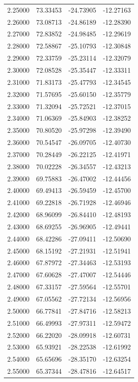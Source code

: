 \begin{table}
\begin{tabular}{llll}
2.25000 & 73.33453 & -24.73905 & -12.27163 \\
2.26000 & 73.08713 & -24.86189 & -12.28390 \\
2.27000 & 72.83852 & -24.98485 & -12.29619 \\
2.28000 & 72.58867 & -25.10793 & -12.30848 \\
2.29000 & 72.33759 & -25.23114 & -12.32079 \\
2.30000 & 72.08528 & -25.35447 & -12.33311 \\
2.31000 & 71.83173 & -25.47793 & -12.34545 \\
2.32000 & 71.57695 & -25.60150 & -12.35779 \\
2.33000 & 71.32094 & -25.72521 & -12.37015 \\
2.34000 & 71.06369 & -25.84903 & -12.38252 \\
2.35000 & 70.80520 & -25.97298 & -12.39490 \\
2.36000 & 70.54547 & -26.09705 & -12.40730 \\
2.37000 & 70.28449 & -26.22125 & -12.41971 \\
2.38000 & 70.02228 & -26.34557 & -12.43213 \\
2.39000 & 69.75883 & -26.47002 & -12.44456 \\
2.40000 & 69.49413 & -26.59459 & -12.45700 \\
2.41000 & 69.22818 & -26.71928 & -12.46946 \\
2.42000 & 68.96099 & -26.84410 & -12.48193 \\
2.43000 & 68.69255 & -26.96905 & -12.49441 \\
2.44000 & 68.42286 & -27.09411 & -12.50690 \\
2.45000 & 68.15192 & -27.21931 & -12.51941 \\
2.46000 & 67.87972 & -27.34463 & -12.53193 \\
2.47000 & 67.60628 & -27.47007 & -12.54446 \\
2.48000 & 67.33157 & -27.59564 & -12.55701 \\
2.49000 & 67.05562 & -27.72134 & -12.56956 \\
2.50000 & 66.77841 & -27.84716 & -12.58213 \\
2.51000 & 66.49993 & -27.97311 & -12.59472 \\
2.52000 & 66.22020 & -28.09918 & -12.60731 \\
2.53000 & 65.93921 & -28.22538 & -12.61992 \\
2.54000 & 65.65696 & -28.35170 & -12.63254 \\
2.55000 & 65.37344 & -28.47816 & -12.64517 \\

\end{tabular}
\end{table}
